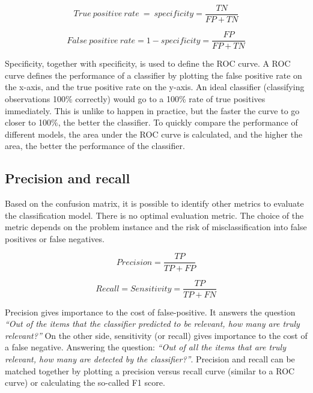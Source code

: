 \begin{equation}
    True\ positive\ rate\ =\ specificity=\frac{TN}{FP+TN}
    \label{eq_specificity}
\end{equation}

\begin{equation}
    False\ positive\ rate=1-specificity=\frac{FP}{FP+TN}
    \label{eq_falsePositiveRate}
\end{equation}

Specificity, together with specificity, is used to define the ROC curve. A ROC curve defines the performance of a classifier by plotting the false positive rate on the x-axis, and the true positive rate on the y-axis. An ideal classifier (classifying observations 100\% correctly) would go to a 100\% rate of true positives immediately. This is unlike to happen in practice, but the faster the curve to go closer to 100\%, the better the classifier. To quickly compare the performance of different models, the area under the ROC curve is calculated, and the higher the area, the better the performance of the classifier.

\subsection{Precision and recall}
Based on the confusion matrix, it is possible to identify other metrics to evaluate the classification model. There is no optimal evaluation metric. The choice of the metric depends on the problem instance and the risk of misclassification into false positives or false negatives.

\begin{equation}
    Precision=\frac{TP}{TP+FP}
    \label{eq_precision}
\end{equation}

\begin{equation}
    Recall=Sensitivity=\frac{TP}{TP+FN}
    \label{eq_recall}
\end{equation}

Precision gives importance to the cost of false-positive. It answers the question \textit{“Out of the items that the classifier predicted to be relevant, how many are truly relevant?”} On the other side, sensitivity (or recall) gives importance to the cost of a false negative. Answering the question: \textit{“Out of all the items that are truly relevant, how many are detected by the classifier?”}. Precision and recall can be matched together by plotting a precision versus recall curve (similar to a ROC curve) or calculating the so-called F1 score.

